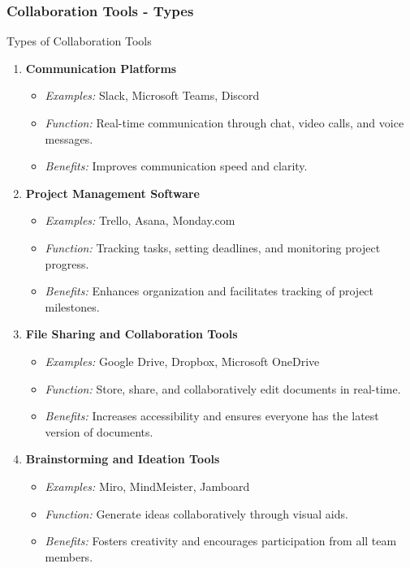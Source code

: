 \documentclass[aspectratio=169]{beamer}
\begin{document}
\begin{frame}[fragile]
    \frametitle{Collaboration Tools - Types}
    \begin{block}{Types of Collaboration Tools}
        \begin{enumerate}
            \item \textbf{Communication Platforms}
                \begin{itemize}
                    \item \textit{Examples:} Slack, Microsoft Teams, Discord
                    \item \textit{Function:} Real-time communication through chat, video calls, and voice messages.
                    \item \textit{Benefits:} Improves communication speed and clarity.
                \end{itemize}
            \item \textbf{Project Management Software}
                \begin{itemize}
                    \item \textit{Examples:} Trello, Asana, Monday.com
                    \item \textit{Function:} Tracking tasks, setting deadlines, and monitoring project progress.
                    \item \textit{Benefits:} Enhances organization and facilitates tracking of project milestones.
                \end{itemize}
            \item \textbf{File Sharing and Collaboration Tools}
                \begin{itemize}
                    \item \textit{Examples:} Google Drive, Dropbox, Microsoft OneDrive
                    \item \textit{Function:} Store, share, and collaboratively edit documents in real-time.
                    \item \textit{Benefits:} Increases accessibility and ensures everyone has the latest version of documents.
                \end{itemize}
            \item \textbf{Brainstorming and Ideation Tools}
                \begin{itemize}
                    \item \textit{Examples:} Miro, MindMeister, Jamboard
                    \item \textit{Function:} Generate ideas collaboratively through visual aids.
                    \item \textit{Benefits:} Fosters creativity and encourages participation from all team members.
                \end{itemize}
        \end{enumerate}
    \end{block}
\end{frame}
\end{document}
